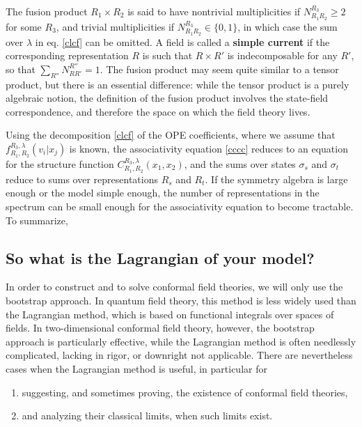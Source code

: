 \documentclass[12pt, a4paper, notitlepage, twoside]{report}
\numberwithin{equation}{section}
\theoremstyle{break}
\begin{document}
The fusion product $R_1\times R_2$ is said to have nontrivial multiplicities if $N_{R_1R_2}^{R_3}\geq 2$ for some $R_3$, and trivial multiplicities if $N_{R_1R_2}^{R_3}\in \{0,1\}$, in which case the sum over $\lambda$ in eq. \eqref{clcf} can be omitted.
A field is called a \textbf{\boldmath simple current} if the corresponding representation $R$ is such that $R\times R'$ is indecomposable for any $R'$, so that $\sum_{R''} N_{RR'}^{R''} =1$. 
The fusion product may seem quite similar to a tensor product, but there is an essential difference: while the tensor product is a purely algebraic notion, the definition of the fusion product involves the state-field correspondence, and therefore the space on which the field theory lives. 

Using the decomposition \eqref{clcf} of the OPE coefficients, where we assume that $f_{R_1,R_2}^{R_3,\lambda}(v_i|x_j)$ is known, the 
associativity equation \eqref{cccc} reduces to an equation for the structure function $C_{R_1,R_2}^{R_3,\lambda}(x_1,x_2)$, and the sums over states $\sigma_s$ and $\sigma_t$ reduce to sums over representations $R_s$ and $R_t$.
If the symmetry algebra is large enough or the model simple enough, the number of representations in the spectrum can be small enough for the associativity equation to become tractable.
To summarize,
\begin{center}
\end{center}


\subsection{So what is the Lagrangian of your model? \label{seclagr}}

In order to construct and to solve conformal field theories, we will only use the bootstrap approach.
In quantum field theory, this method is less widely used than the Lagrangian method, which is based on functional integrals over spaces of fields.
In two-dimensional conformal field theory, however, the bootstrap approach is particularly effective, while the Lagrangian method is often needlessly complicated, lacking in rigor, or downright not applicable. 
There are nevertheless cases when the Lagrangian method is useful, in particular for 
\begin{enumerate}
\item suggesting, and sometimes proving, the existence of conformal field theories,
\item  and analyzing their classical limits, when such limits exist. 
\end{enumerate}
\end{document}
